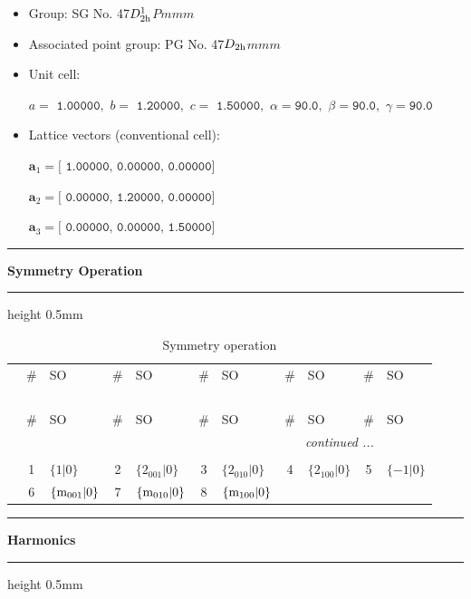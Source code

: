 \documentclass[fleqn,10pt,landscape]{jsarticle}
\begin{document}
\begin{itemize}
\item Group: SG No. 47\quad$D_{\rm 2h}^{1}$\quad$Pmmm$\quad[ orthorhombic ]
\item Associated point group: PG No. 47\quad$D_{\rm 2h}$\quad$mmm$\quad[ orthorhombic ]
\end{itemize}
\begin{itemize}
\item Unit cell:

\quad $a=\texttt{ 1.00000},\,\, b=\texttt{ 1.20000},\,\, c=\texttt{ 1.50000},\,\, \alpha=\texttt{90.0},\,\, \beta=\texttt{90.0},\,\, \gamma=\texttt{90.0}$

\item Lattice vectors (conventional cell):

\quad $\bm{a}_1=\texttt{[ 1.00000, 0.00000, 0.00000]}$

\quad $\bm{a}_2=\texttt{[ 0.00000, 1.20000, 0.00000]}$

\quad $\bm{a}_3=\texttt{[ 0.00000, 0.00000, 1.50000]}$

\end{itemize}
\vspace{5mm}
\noindent \rule[0.5mm]{5mm}{0.5mm}\hspace{3mm}\textbf{Symmetry Operation}\hspace{3mm}\leaders\hrule height 0.5mm\hfill\kern0pt
\vspace{3mm}

\renewcommand{\arraystretch}{1.6}
\begin{longtable}[l]{c|cl|cl|cl|cl|cl}
\captionsetup{justification=raggedright, singlelinecheck=off}
\caption{Symmetry operation}
 \\
 \hline \hline
 & \# & SO & \# & SO & \# & SO & \# & SO & \# & SO \\ \hline \endfirsthead

\multicolumn{10}{l}{\tablename\ \thetable{}} \\
 \hline \hline
 & \# & SO & \# & SO & \# & SO & \# & SO & \# & SO \\ \hline \endhead

 \hline \hline
\multicolumn{10}{r}{\footnotesize\it continued ...} \\ \endfoot

 \hline \hline
\multicolumn{10}{r}{} \\ \endlastfoot

 & 1 & $\{1|0\}$ & 2 & $\{2{}_{001}|0\}$ & 3 & $\{2{}_{010}|0\}$ & 4 & $\{2{}_{100}|0\}$ & 5 & $\{-1|0\}$ \\
& 6 & $\{{\rm m}_{001}|0\}$ & 7 & $\{{\rm m}_{010}|0\}$ & 8 & $\{{\rm m}_{100}|0\}$ &  &  &  &  \\
\end{longtable}
\vspace{5mm}
\noindent \rule[0.5mm]{5mm}{0.5mm}\hspace{3mm}\textbf{Harmonics}\hspace{3mm}\leaders\hrule height 0.5mm\hfill\kern0pt
\vspace{3mm}
\end{document}
